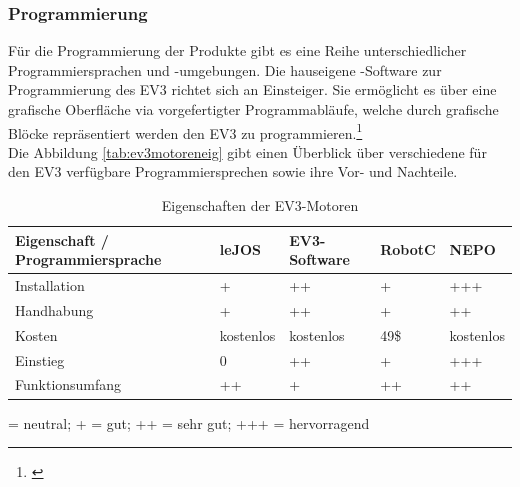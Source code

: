 \subsubsection{Programmierung}
Für die Programmierung der \LM{} Produkte gibt es eine Reihe unterschiedlicher Programmiersprachen und -umgebungen. Die hauseigene \LE{}-Software zur Programmierung des EV3 richtet sich an Einsteiger. Sie ermöglicht es über eine grafische Oberfläche via vorgefertigter Programmabläufe, welche durch grafische Blöcke repräsentiert werden den EV3 zu programmieren.\footnote{\citep[vgl.][EV3-Programmieren mit Java, Seite 25 f.]{Schobel.RobertaEV3Programmieren}\label{note33}} \\
Die Abbildung \eqref{tab:ev3motoreneig} gibt einen Überblick über verschiedene für den EV3 verfügbare Programmiersprechen sowie ihre Vor- und Nachteile.
\begin{table}[ht]
	\begin{tabular}{|p{}|p{}|p{}|p{}|p{}|} \hline
		Eigenschaft / Programmiersprache  & leJOS      & EV3-Software  & RobotC  & NEPO       \\ \hline
		Installation                      & +          & ++            & +       & +++        \\ \hline
		Handhabung    		           	  & +          & ++            & +       & ++         \\ \hline
		Kosten                            & kostenlos  & kostenlos     & 49\$    & kostenlos  \\ \hline
		Einstieg 	                      & 0          & ++            & +       & +++        \\ \hline  
		Funktionsumfang    				  & ++         & +             & ++      & ++         \\ \hline
	\end{tabular}
	\centering
	 = neutral; + = gut; ++ = sehr gut; +++ = hervorragend
	\caption[Eigenschaften der EV3-Motortypen]{Eigenschaften der EV3-Motoren}
	\label{tab:ev3motoreneig}
\end{table}
\newpage
